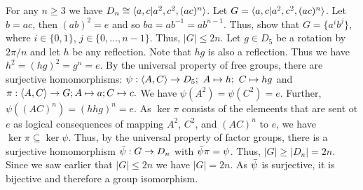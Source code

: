 For any $n \ge 3$ we have $D_n \cong \langle a, c |a^2, c^2, (ac)^n \rangle$.
\wpf{} Let $G = \langle a, c |a^2, c^2, (ac)^n \rangle$. Let $b = ac$, then $(ab)^2 = e$ and so $ba = ab^{-1} = ab^{n-1}$. Thus, show that $G = \{a^ib^j\}$, where $i \in \{0,1\}$, $j \in \{0, \ldots, n-1\}$. Thus, $|G| \le 2n$. Let $g \in D_5$ be a rotation by $2\pi/n$ and let $h$ be any reflection. Note that $hg$ is also a reflection. Thus we have $h^2 = (hg)^2 = g^n = e$. By the universal property of free groups, there are surjective homomorphisms: $\psi:\langle A,C \rangle \to D_5;\ A \mapsto h;\ C \mapsto hg$ and $\pi: \langle A,C \rangle \to G; A \mapsto a; C \mapsto c.$ We have $\psi(A^2) = \psi(C^2) = e.$ Further, $\psi((AC)^n) = (hhg)^n = e.$ As $\ker\pi$ consists of the elemeents that are sent ot $e$ as logical consequences of mapping $A^2$, $C^2$, and $(AC)^n$ to $e$, we have $\ker \pi \subseteq \ker \psi.$ Thus, by the universal property of factor groups, there is a surjective homomorphism $\Bar{\psi}: G \to D_n$ with $\Bar{\psi}\pi = \psi$. Thus, $|G| \ge |D_n| = 2n.$ Since we saw earlier that $|G| \le 2n$ we have $|G| = 2n$. As $\Bar{\psi}$ is surjective, it is bijective and therefore a group isomorphism.